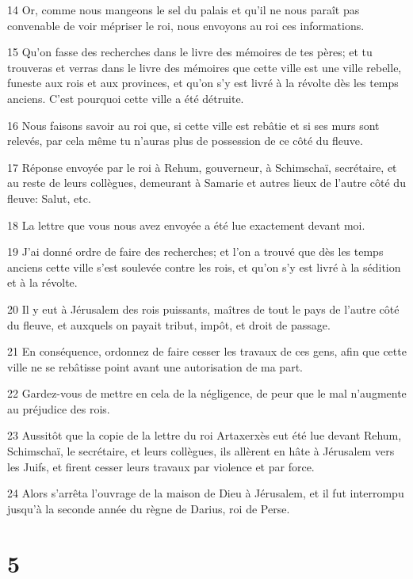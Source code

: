 \par 14 Or, comme nous mangeons le sel du palais et qu'il ne nous paraît pas convenable de voir mépriser le roi, nous envoyons au roi ces informations.
\par 15 Qu'on fasse des recherches dans le livre des mémoires de tes pères; et tu trouveras et verras dans le livre des mémoires que cette ville est une ville rebelle, funeste aux rois et aux provinces, et qu'on s'y est livré à la révolte dès les temps anciens. C'est pourquoi cette ville a été détruite.
\par 16 Nous faisons savoir au roi que, si cette ville est rebâtie et si ses murs sont relevés, par cela même tu n'auras plus de possession de ce côté du fleuve.
\par 17 Réponse envoyée par le roi à Rehum, gouverneur, à Schimschaï, secrétaire, et au reste de leurs collègues, demeurant à Samarie et autres lieux de l'autre côté du fleuve: Salut, etc.
\par 18 La lettre que vous nous avez envoyée a été lue exactement devant moi.
\par 19 J'ai donné ordre de faire des recherches; et l'on a trouvé que dès les temps anciens cette ville s'est soulevée contre les rois, et qu'on s'y est livré à la sédition et à la révolte.
\par 20 Il y eut à Jérusalem des rois puissants, maîtres de tout le pays de l'autre côté du fleuve, et auxquels on payait tribut, impôt, et droit de passage.
\par 21 En conséquence, ordonnez de faire cesser les travaux de ces gens, afin que cette ville ne se rebâtisse point avant une autorisation de ma part.
\par 22 Gardez-vous de mettre en cela de la négligence, de peur que le mal n'augmente au préjudice des rois.
\par 23 Aussitôt que la copie de la lettre du roi Artaxerxès eut été lue devant Rehum, Schimschaï, le secrétaire, et leurs collègues, ils allèrent en hâte à Jérusalem vers les Juifs, et firent cesser leurs travaux par violence et par force.
\par 24 Alors s'arrêta l'ouvrage de la maison de Dieu à Jérusalem, et il fut interrompu jusqu'à la seconde année du règne de Darius, roi de Perse.

\chapter{5}

